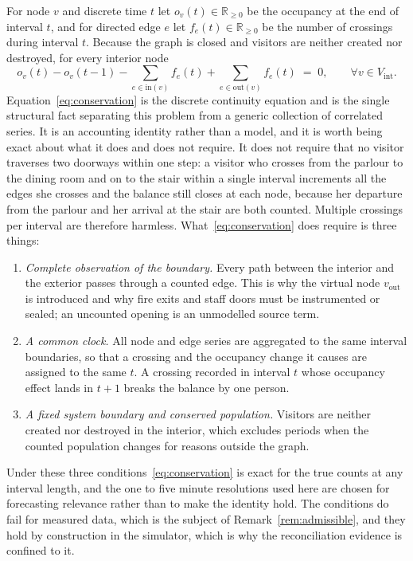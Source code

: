 \documentclass[utf8]{FrontiersinHarvard}
\newif\ifrevisionmarkup
\newcommand{\new}[1]{\ifrevisionmarkup\textcolor{revision}{#1}\else#1\fi}
\newif\ifsecondrevisionmarkup
\newcommand{\rev}[1]{\ifsecondrevisionmarkup\textcolor{revisiontwo}{#1}\else#1\fi}
\theoremstyle{plain}
\theoremstyle{definition}
\theoremstyle{remark}
\newcommand{\Rb}{\mathbb{R}}
\begin{document}
For node $v$ and discrete time $t$ let $o_v(t) \in \Rb_{\ge 0}$ be the occupancy at the end of interval $t$, and for directed edge $e$ let $f_e(t) \in \Rb_{\ge 0}$ be the number of crossings during interval $t$. Because the graph is closed and visitors are neither created nor destroyed, for every interior node
\begin{equation}
o_v(t) - o_v(t-1) - \sum_{e \in \mathrm{in}(v)} f_e(t) + \sum_{e \in \mathrm{out}(v)} f_e(t) \;=\; 0,
\qquad \forall v \in V_{\mathrm{int}}.
\label{eq:conservation}
\end{equation}
Equation~\eqref{eq:conservation} is the discrete continuity equation and is the single structural fact separating this problem from a generic collection of correlated series. \new{It is an accounting identity rather than a model, and it is worth being exact about what it does and does not require. \rev{It does not require that no visitor traverses two doorways within one step:} a visitor who crosses from the parlour to the dining room and on to the stair within a single interval increments all the edges she crosses and the balance still closes at each node, because her departure from the parlour and her arrival at the stair are both counted. Multiple crossings per interval are therefore harmless. What~\eqref{eq:conservation} does require is three things:}
\new{\begin{enumerate}
\item \emph{Complete observation of the boundary.} Every path between the interior and the exterior passes through a counted edge. This is why the virtual node $v_{\mathrm{out}}$ is introduced and why fire exits and staff doors must be instrumented or sealed; an uncounted opening is an unmodelled source term.
\item \emph{A common clock.} All node and edge series are aggregated to the same interval boundaries, so that a crossing and the occupancy change it causes are assigned to the same $t$. A crossing recorded in interval $t$ whose occupancy effect lands in $t+1$ breaks the balance by one person.
\item \emph{A fixed system boundary and conserved population.} Visitors are neither created nor destroyed in the interior, which excludes periods when the counted population changes for reasons outside the graph.
\end{enumerate}}
\new{Under these three conditions~\eqref{eq:conservation} is exact for the true counts at any interval length, and the one to five minute resolutions used here are chosen for forecasting relevance rather than to make the identity hold. The conditions do fail for measured data, which is the subject of Remark~\ref{rem:admissible}, and they hold by construction in the simulator, which is why the reconciliation evidence is confined to it.}
\end{document}
